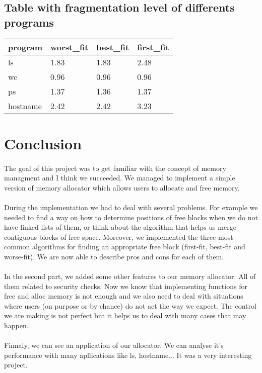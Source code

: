 \documentclass[a4paper,10pt]{article}
\begin{document}
\subsection{Table with fragmentation level of differents programs}

\begin{tabular}{|R{2cm}|C{1.5cm}|L{1.5cm}|L{1.5cm}|}
\hline {}program & worst\_fit & best\_fit & first\_fit \\
\hline  ls & 1.83 & 1.83 & 2.48 \\
\hline  wc & 0.96 & 0.96 & 0.96 \\
\hline  ps & 1.37 & 1.36 & 1.37 \\
\hline  hostname & 2.42 & 2.42 & 3.23 \\
\hline 
\end{tabular}

\section{Conclusion}
\paragraph{}
The goal of this project was to get familiar with the concept of memory 
managment and I think we succeeded. We managed to implement a simple 
version of memory allocator which allows users to allocate and free memory.
\paragraph{} 
During the implementation we had to deal with several problems. For 
example we needed to find a way on how to determine positions of free 
blocks when we do not have linked lists of them, or think about the 
algorithm that helps us merge contiguous blocks of free space. Moreover, 
we implemented the three most common algorithms for finding an appropriate 
free block (first-fit, best-fit and worse-fit). We are now able to describe 
pros and cons for each of them.
\paragraph{}
In the second part, we added some other features to our memory allocator. 
All of them related to security checks. Now we know that implementing 
functions for free and alloc memory is not enough and we also need 
to deal with situations where users (on purpose or by chance) do not act the 
way we expect. The control we are making is not perfect but it helps 
us to deal with many cases that may happen.

\paragraph{}
Finnaly, we can see an application of our allocator. We can analyse it's
performance with many apllications like ls, hostname... It was a very 
interesting project.

 
\end{document}
